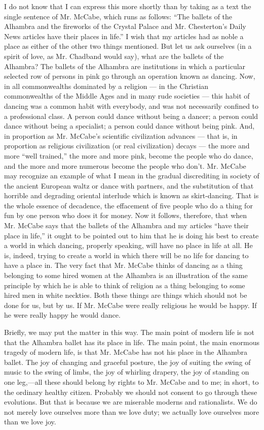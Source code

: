 I do not know that I can express this more shortly than by taking as a text the single sentence of Mr. McCabe, which runs as follows: “The ballets of the Alhambra and the fireworks of the Crystal Palace and Mr. Chesterton’s Daily News articles have their places in life.” I wish that my articles had as noble a place as either of the other two things mentioned. But let us ask ourselves (in a spirit of love, as Mr. Chadband would say), what are the ballets of the Alhambra? The ballets of the Alhambra are institutions in which a particular selected row of persons in pink go through an operation known as dancing. Now, in all commonwealths dominated by a religion — in the Christian commonwealths of the Middle Ages and in many rude societies — this habit of dancing was a common habit with everybody, and was not necessarily confined to a professional class. A person could dance without being a dancer; a person could dance without being a specialist; a person could dance without being pink. And, in proportion as Mr. McCabe’s scientific civilization advances — that is, in proportion as religious civilization (or real civilization) decays — the more and more “well trained,” the more and more pink, become the people who do dance, and the more and more numerous become the people who don’t. Mr. McCabe may recognize an example of what I mean in the gradual discrediting in society of the ancient European waltz or dance with partners, and the substitution of that horrible and degrading oriental interlude which is known as skirt-dancing. That is the whole essence of decadence, the effacement of five people who do a thing for fun by one person who does it for money. Now it follows, therefore, that when Mr. McCabe says that the ballets of the Alhambra and my articles “have their place in life,” it ought to be pointed out to him that he is doing his best to create a world in which dancing, properly speaking, will have no place in life at all. He is, indeed, trying to create a world in which there will be no life for dancing to have a place in. The very fact that Mr. McCabe thinks of dancing as a thing belonging to some hired women at the Alhambra is an illustration of the same principle by which he is able to think of religion as a thing belonging to some hired men in white neckties. Both these things are things which should not be done for us, but by us. If Mr. McCabe were really religious he would be happy. If he were really happy he would dance.

Briefly, we may put the matter in this way. The main point of modern life is not that the Alhambra ballet has its place in life. The main point, the main enormous tragedy of modern life, is that Mr. McCabe has not his place in the Alhambra ballet. The joy of changing and graceful posture, the joy of suiting the swing of music to the swing of limbs, the joy of whirling drapery, the joy of standing on one leg,—all these should belong by rights to Mr. McCabe and to me; in short, to the ordinary healthy citizen. Probably we should not consent to go through these evolutions. But that is because we are miserable moderns and rationalists. We do not merely love ourselves more than we love duty; we actually love ourselves more than we love joy.

